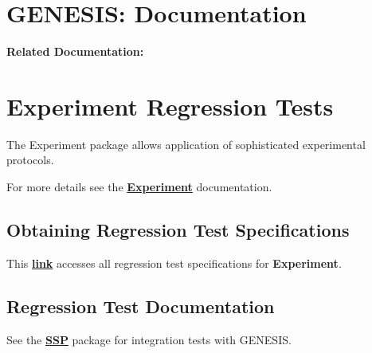 \documentclass[12pt]{article}
\begin{document}
\section*{GENESIS: Documentation}

{\bf Related Documentation:}

\section*{Experiment Regression Tests}

The Experiment package allows application of sophisticated
experimental protocols.

For more details see the \href{../experiment/experiment.tex}{\bf Experiment} documentation.

\subsection*{Obtaining Regression Test Specifications}

This \href{http://www.neurospaces.org/neurospaces_project/experiment/tests/html/index.html}{\bf link} accesses all regression test specifications for {\bf Experiment}.

\subsection*{Regression Test Documentation}

See the \href{../ssp/ssp.tex}{\bf SSP} package for integration tests
with GENESIS.
\end{document}

